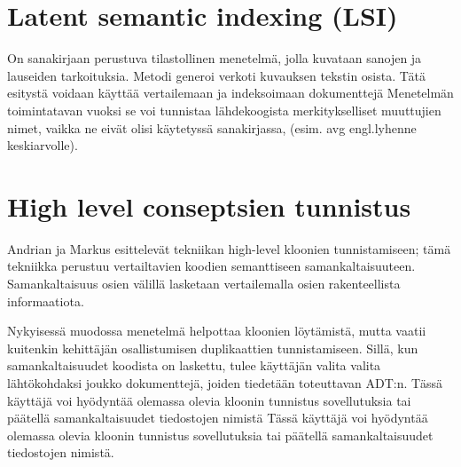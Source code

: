 \documentclass[finnish]{../tktltiki2}
\theoremstyle{definition}
\theoremstyle{remark}
\begin{document}
\section{Latent semantic indexing (LSI)}
On sanakirjaan perustuva tilastollinen menetelmä, jolla kuvataan sanojen ja lauseiden tarkoituksia.
Metodi generoi verkoti kuvauksen tekstin osista. Tätä esitystä voidaan käyttää vertailemaan ja indeksoimaan dokumenttejä
Menetelmän toimintatavan vuoksi se voi tunnistaa lähdekoogista merkitykselliset muuttujien nimet, vaikka ne eivät
olisi käytetyssä sanakirjassa, (esim. avg engl.lyhenne keskiarvolle).



\section{High level conseptsien tunnistus}
Andrian ja Markus esittelevät tekniikan high-level kloonien tunnistamiseen; tämä tekniikka perustuu vertailtavien
koodien semanttiseen samankaltaisuuteen. Samankaltaisuus osien välillä lasketaan vertailemalla osien rakenteellista
informaatiota.

Nykyisessä muodossa menetelmä helpottaa kloonien löytämistä, mutta vaatii kuitenkin kehittäjän osallistumisen
duplikaattien  tunnistamiseen. Sillä, kun samankaltaisuudet koodista on laskettu, tulee käyttäjän valita valita
lähtökohdaksi joukko dokumenttejä, joiden tiedetään toteuttavan ADT:n.
Tässä käyttäjä voi hyödyntää olemassa olevia kloonin tunnistus sovellutuksia tai päätellä samankaltaisuudet tiedostojen
nimistä
Tässä käyttäjä voi hyödyntää olemassa olevia kloonin tunnistus sovellutuksia tai päätellä samankaltaisuudet tiedostojen
nimistä.
\end{document}
